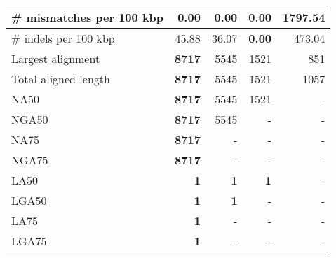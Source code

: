 \documentclass[12pt,a4paper]{article}
\begin{document}
\begin{table}[ht]
\begin{center}
\begin{tabular}{|l*{4}{|r}|}
\# mismatches per 100 kbp & {\bf 0.00} & {\bf 0.00} & {\bf 0.00} & 1797.54 \\ \hline
\# indels per 100 kbp & 45.88 & 36.07 & {\bf 0.00} & 473.04 \\ \hline
Largest alignment & {\bf 8717} & 5545 & 1521 & 851 \\ \hline
Total aligned length & {\bf 8717} & 5545 & 1521 & 1057 \\ \hline
NA50 & {\bf 8717} & 5545 & 1521 & - \\ \hline
NGA50 & {\bf 8717} & 5545 & - & - \\ \hline
NA75 & {\bf 8717} & - & - & - \\ \hline
NGA75 & {\bf 8717} & - & - & - \\ \hline
LA50 & {\bf 1} & {\bf 1} & {\bf 1} & - \\ \hline
LGA50 & {\bf 1} & {\bf 1} & - & - \\ \hline
LA75 & {\bf 1} & - & - & - \\ \hline
LGA75 & {\bf 1} & - & - & - \\ \hline
\end{tabular}
\end{center}
\end{table}
\end{document}
